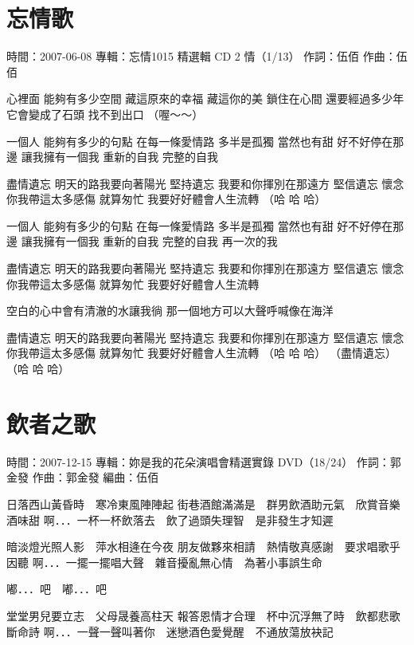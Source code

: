 \documentclass[UTF8,a4paper,oneside,twocolumn,12pt]{ctexbook}
\newcommand{\infopair}[2]{\textbullet #1：#2}
\newcommand{\zc}[1][伍佰]{\infopair{作詞}{#1}}
\newcommand{\zq}[1][伍佰]{\infopair{作曲}{#1}}
\newcommand{\bq}[1][伍佰]{\infopair{編曲}{#1}}
\newcommand{\zj}[1]{\infopair{專輯}{#1}}
\newcommand{\sj}[1]{\infopair{時間}{#1}}
\newenvironment{info}{\begin{flushleft}\kaishu
	}
	{\end{flushleft}\normalsize\yahei\par}
\newenvironment{lyric}{
	}
{}
\begin{document}
\section{忘情歌}
\begin{info}
	\sj{2007-06-08}
	\zj{忘情1015 精選輯 CD 2 情（1/13）}
	\zc
	\zq
\end{info}
\begin{lyric}
	心裡面 能夠有多少空間
	藏這原來的幸福 藏這你的美
	鎖住在心間 還要經過多少年
	它會變成了石頭 找不到出口
	（喔～～）

	一個人 能夠有多少的句點
	在每一條愛情路 多半是孤獨
	當然也有甜 好不好停在那邊
	讓我擁有一個我 重新的自我
	完整的自我

	盡情遺忘 明天的路我要向著陽光
	堅持遺忘 我要和你揮別在那遠方
	堅信遺忘 懷念你我帶這太多感傷
	就算匆忙 我要好好體會人生流轉
	（哈 哈 哈）

	一個人 能夠有多少的句點
	在每一條愛情路 多半是孤獨
	當然也有甜 好不好停在那邊
	讓我擁有一個我 重新的自我
	完整的自我 再一次的我

	盡情遺忘 明天的路我要向著陽光
	堅持遺忘 我要和你揮別在那遠方
	堅信遺忘 懷念你我帶這太多感傷
	就算匆忙 我要好好體會人生流轉

	空白的心中會有清澈的水讓我徜
	那一個地方可以大聲呼喊像在海洋

	盡情遺忘 明天的路我要向著陽光
	堅持遺忘 我要和你揮別在那遠方
	堅信遺忘 懷念你我帶這太多感傷
	就算匆忙 我要好好體會人生流轉
	（哈 哈 哈）
	（盡情遺忘）
	（哈 哈 哈）
\end{lyric}

\section{飲者之歌}
\begin{info}
	\sj{2007-12-15}
	\zj{妳是我的花朵演唱會精選實錄 DVD（18/24）}
	\zc[郭金發]
	\zq[郭金發]
	\bq[伍佰]
\end{info}
\begin{lyric}
	日落西山黃昏時　寒冷東風陣陣起
	街巷酒館滿滿是　群男飲酒助元氣　欣賞音樂酒味甜
	啊．．．一杯一杯飲落去　飲了過頭失理智　是非發生才知遲

	暗淡燈光照人影　萍水相逄在今夜
	朋友做夥來相請　熱情敬真感謝　要求唱歌乎因聽
	啊．．．一擺一擺唱大聲　雜音擾亂無心情　為著小事誤生命

	嘟．．．吧　嘟．．．吧

	堂堂男兒要立志　父母晟養高柱天
	報答恩情才合理　杯中沉浮無了時　飲都悲歌斷命詩
	啊．．．一聲一聲叫著你　迷戀酒色愛覺醒　不通放蕩放袂記
\end{lyric}
\end{document}
